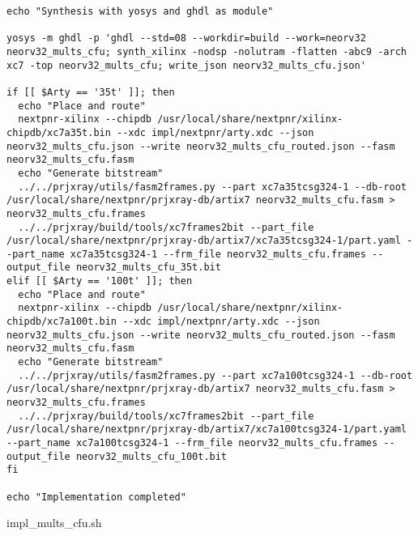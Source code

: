 \begin{code}
\begin{verbatim}
echo "Synthesis with yosys and ghdl as module"

yosys -m ghdl -p 'ghdl --std=08 --workdir=build --work=neorv32 neorv32_mults_cfu; synth_xilinx -nodsp -nolutram -flatten -abc9 -arch xc7 -top neorv32_mults_cfu; write_json neorv32_mults_cfu.json' 

if [[ $Arty == '35t' ]]; then
  echo "Place and route"
  nextpnr-xilinx --chipdb /usr/local/share/nextpnr/xilinx-chipdb/xc7a35t.bin --xdc impl/nextpnr/arty.xdc --json neorv32_mults_cfu.json --write neorv32_mults_cfu_routed.json --fasm neorv32_mults_cfu.fasm
  echo "Generate bitstream"
  ../../prjxray/utils/fasm2frames.py --part xc7a35tcsg324-1 --db-root /usr/local/share/nextpnr/prjxray-db/artix7 neorv32_mults_cfu.fasm > neorv32_mults_cfu.frames
  ../../prjxray/build/tools/xc7frames2bit --part_file /usr/local/share/nextpnr/prjxray-db/artix7/xc7a35tcsg324-1/part.yaml --part_name xc7a35tcsg324-1 --frm_file neorv32_mults_cfu.frames --output_file neorv32_mults_cfu_35t.bit
elif [[ $Arty == '100t' ]]; then
  echo "Place and route"
  nextpnr-xilinx --chipdb /usr/local/share/nextpnr/xilinx-chipdb/xc7a100t.bin --xdc impl/nextpnr/arty.xdc --json neorv32_mults_cfu.json --write neorv32_mults_cfu_routed.json --fasm neorv32_mults_cfu.fasm
  echo "Generate bitstream"
  ../../prjxray/utils/fasm2frames.py --part xc7a100tcsg324-1 --db-root /usr/local/share/nextpnr/prjxray-db/artix7 neorv32_mults_cfu.fasm > neorv32_mults_cfu.frames
  ../../prjxray/build/tools/xc7frames2bit --part_file /usr/local/share/nextpnr/prjxray-db/artix7/xc7a100tcsg324-1/part.yaml --part_name xc7a100tcsg324-1 --frm_file neorv32_mults_cfu.frames --output_file neorv32_mults_cfu_100t.bit
fi

echo "Implementation completed"
\end{verbatim}
\caption{impl\_mults\_cfu.sh}
\label{ap-cod:23}
\end{code}
